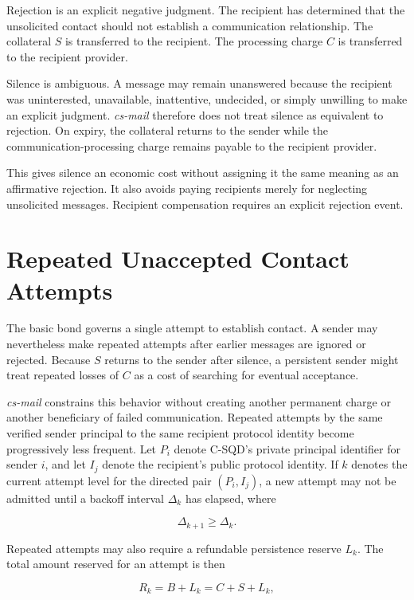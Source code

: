 \documentclass[11pt]{article}
\begin{document}
Rejection is an explicit negative judgment. The recipient has determined that the unsolicited contact should not establish a communication relationship. The collateral $S$ is transferred to the recipient. The processing charge $C$ is transferred to the recipient provider.

Silence is ambiguous. A message may remain unanswered because the recipient was uninterested, unavailable, inattentive, undecided, or simply unwilling to make an explicit judgment. \textit{cs-mail} therefore does not treat silence as equivalent to rejection. On expiry, the collateral returns to the sender while the communication-processing charge remains payable to the recipient provider.

This gives silence an economic cost without assigning it the same meaning as an affirmative rejection. It also avoids paying recipients merely for neglecting unsolicited messages. Recipient compensation requires an explicit rejection event.

\section{Repeated Unaccepted Contact Attempts}

The basic bond governs a single attempt to establish contact. A sender may nevertheless make repeated attempts after earlier messages are ignored or rejected. Because $S$ returns to the sender after silence, a persistent sender might treat repeated losses of $C$ as a cost of searching for eventual acceptance.

\textit{cs-mail} constrains this behavior without creating another permanent charge or another beneficiary of failed communication. Repeated attempts by the same verified sender principal to the same recipient protocol identity become progressively less frequent. Let $P_i$ denote C-SQD's private principal identifier for sender $i$, and let $I_j$ denote the recipient's public protocol identity. If $k$ denotes the current attempt level for the directed pair $(P_i,I_j)$, a new attempt may not be admitted until a backoff interval $\Delta_k$ has elapsed, where

\begin{equation}
\Delta_{k+1}\geq\Delta_k.
\end{equation}

Repeated attempts may also require a refundable persistence reserve $L_k$. The total amount reserved for an attempt is then

\begin{equation}
R_k=B+L_k=C+S+L_k,
\end{equation}
\end{document}
